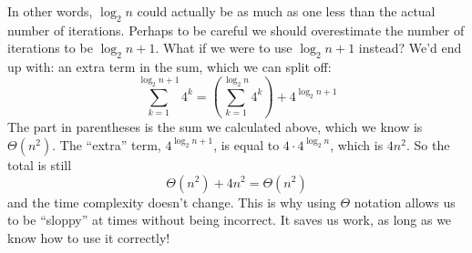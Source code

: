 \begin{prob}
\begin{soln}
        In other words, $\log_2 n$ could actually be as much as one less than the actual number
        of iterations. Perhaps to be careful we should overestimate the number of iterations
        to be $\log_2 n + 1$. What if we were to use $\log_2 n + 1$ instead? We'd end up with:
        an extra term in the sum, which we can split off:
        \[
            \sum_{k=1}^{\log_2 n + 1} 4^k = \left(
            \sum_{k=1}^{\log_2 n} 4^k
            \right)
            +
            4^{\log_2 n + 1}
        \]
        The part in parentheses is the sum we calculated above, which we know is $\Theta(n^2)$.
        The ``extra'' term, $4^{\log_2 n + 1}$, is equal to $4 \cdot 4^{\log_2 n}$, which is
        $4 n^2$. So the total is still $$\Theta(n^2) + 4 n^2 = \Theta(n^2)$$
        and the time complexity doesn't change. This is why using $\Theta$ notation allows us
        to be ``sloppy'' at times without being incorrect. It saves us work, as long as
        we know how to use it correctly!
    \end{soln}

\end{prob}

